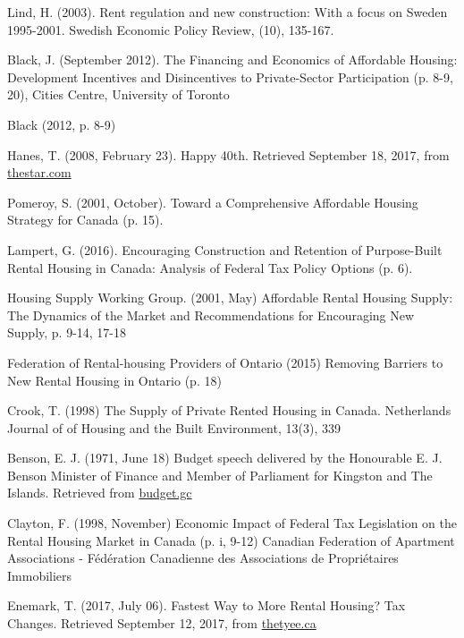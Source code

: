 \begin{thebibliography}{9}
Lind, H. (2003). Rent regulation and new construction: With a focus on Sweden 1995-2001. Swedish Economic Policy Review, (10), 135-167.

 Black, J. (September 2012). The Financing and Economics of Affordable Housing: Development Incentives and Disincentives to Private-Sector Participation (p. 8-9, 20), Cities Centre, University of Toronto

 Black (2012, p. 8-9)

  Hanes, T. (2008, February 23). Happy 40th. Retrieved September 18, 2017, from \href{https://www.thestar.com/news/2008/02/23/happy_40th.html}{thestar.com}

 Pomeroy, S. (2001, October). Toward a Comprehensive Affordable Housing Strategy for Canada (p. 15).

Lampert, G. (2016). Encouraging Construction and Retention of Purpose-Built Rental Housing in Canada: Analysis of Federal Tax Policy Options (p. 6). 

 Housing Supply Working Group. (2001, May) Affordable Rental Housing Supply: The Dynamics of the Market and Recommendations for Encouraging New Supply, p. 9-14, 17-18

 Federation of Rental-housing Providers of Ontario (2015) Removing Barriers to New Rental Housing in Ontario (p. 18)

 Crook, T. (1998) The Supply of Private Rented Housing in Canada. Netherlands Journal of of Housing and the Built Environment, 13(3), 339

  Benson, E. J. (1971, June 18) Budget speech delivered by the Honourable E. J. Benson Minister of Finance and Member of Parliament for Kingston and The Islands. Retrieved from \href{http://www.budget.gc.ca/pdfarch/1971-sd-eng.pdf}{budget.gc}

 Clayton, F. (1998, November) Economic Impact of Federal Tax Legislation on the Rental Housing Market in Canada (p. i, 9-12) Canadian Federation of Apartment Associations - Fédération Canadienne des Associations de Propriétaires Immobiliers

  Enemark, T. (2017, July 06). Fastest Way to More Rental Housing? Tax Changes. Retrieved September 12, 2017, from \href{https://thetyee.ca/Opinion/2017/07/06/Tax-Changes-More-Rental-Housing/}{thetyee.ca}


\end{thebibliography}
